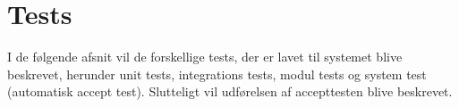 \chapter{Tests}

I de følgende afsnit vil de forskellige tests, der er lavet til systemet blive beskrevet, herunder unit tests, integrations tests, modul tests og system test (automatisk accept test). Slutteligt vil udførelsen af accepttesten blive beskrevet.
